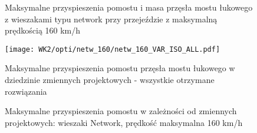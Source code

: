 \begin{figure}[hbt!]
	\centering
	\captionsetup{justification=centering}
	\caption{Maksymalne przyspieszenia pomostu i masa przęsła mostu łukowego z wieszakami typu network przy przejeździe z maksymalną prędkością 160 km/h}
	\label{fig:wk2_opti_netw_160_variables}
\end{figure}
\begin{figure}[hbt!]
	\centering
	\texttt{[image: WK2/opti/netw\_160/netw\_160\_VAR\_ISO\_ALL.pdf]}
	\captionsetup{justification=centering}
	\caption{Maksymalne przyspieszenia pomostu przęsła mostu łukowego w dziedzinie zmiennych projektowych - wszystkie otrzymane rozwiązania}
	\label{fig:wk2_opti_netw_160_vars_all}
\end{figure}
\begin{figure}[hbt!]
	\centering
	\captionsetup{justification=centering}
	\caption{Maksymalne przyspieszenia pomostu w zależności od zmiennych projektowych: wieszaki Network, prędkość maksymalna 160 km/h}
	\label{fig:wk2_opti_netw_160_var_2d}
\end{figure}
